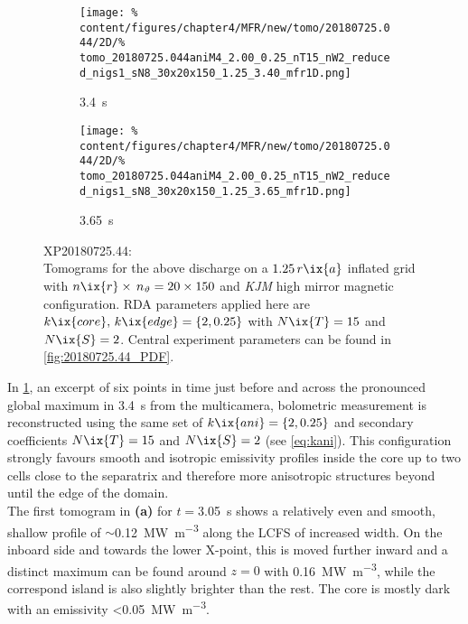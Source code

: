 \begin{figure}[t]
                \newline%
                \begin{subfigure}{0.45\textwidth}%
                    \centering%
                    \caption{\SI{3.4}{\second}}%
                    \vspace*{-0.1cm}%
                    \texttt{[image: \%
                        content/figures/chapter4/MFR/new/tomo/20180725.044/2D/\%
                        tomo\_20180725.044aniM4\_2.00\_0.25\_nT15\_nW2\_reduced\_nigs1\_sN8\_30x20x150\_1.25\_3.40\_mfr1D.png]}%
                \end{subfigure}%
                \hfill%
                \begin{subfigure}{0.45\textwidth}%
                    \centering%
                    \caption{\SI{3.65}{\second}}%
                    \vspace*{-0.1cm}%
                    \texttt{[image: \%
                        content/figures/chapter4/MFR/new/tomo/20180725.044/2D/\%
                        tomo\_20180725.044aniM4\_2.00\_0.25\_nT15\_nW2\_reduced\_nigs1\_sN8\_30x20x150\_1.25\_3.65\_mfr1D.png]}%
                \end{subfigure}%
                \caption{%
                    XP20180725.44:\\%
                    Tomograms for the above discharge on a $1.25\,r\ix{a}$ inflated grid with $n\ix{r}\times\,n_{\vartheta}=20\times150$ and \textit{KJM} high mirror magnetic configuration. RDA parameters applied here are $k\ix{core},\,k\ix{edge}=\left\{2, 0.25\right\}$ with $N\ix{T}=15$ and $N\ix{S}=2$. Central experiment parameters can be found in \cref{fig:20180725.44_PDF}.}\label{fig:tomo_20180725.44_times}%
            \end{figure}%
%
            In \cref{fig:tomo_20180725.44_times}, an excerpt of six points in time just before and across the pronounced global maximum in \SI{3.4}{\second} from the multicamera, bolometric measurement is reconstructed using the same set of $k\ix{ani}=\left\{2, 0.25\right\}$ and secondary coefficients $N\ix{T}=15$ and $N\ix{S}=2$ (see \cref{eq:kani}). This configuration strongly favours smooth and isotropic emissivity profiles inside the core up to two cells close to the separatrix and therefore more anisotropic structures beyond until the edge of the domain.\\%
            The first tomogram in \textbf{(a)} for $t=$\SI{3.05}{\second} shows a relatively even and smooth, shallow profile of $\sim$\SI{0.12}{\mega\watt\per\cubic\meter} along the LCFS of increased width. On the inboard side and towards the lower X-point, this is moved further inward and a distinct maximum can be found around $z=0$ with \SI{0.16}{\mega\watt\per\cubic\meter}, while the correspond island is also slightly brighter than the rest. The core is mostly dark with an emissivity <\SI{0.05}{\mega\watt\per\cubic\meter}.\\%
